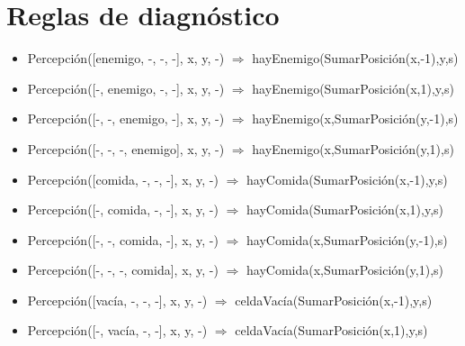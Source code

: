 \section{Reglas de diagnóstico}

\begin{itemize}

\item Percepción([enemigo, -, -, -], x, y, -) $\Rightarrow$
\newline hayEnemigo(SumarPosición(x,-1),y,s)

\item Percepción([-, enemigo, -, -], x, y, -) $\Rightarrow$
\newline hayEnemigo(SumarPosición(x,1),y,s)

\item Percepción([-, -, enemigo, -], x, y, -) $\Rightarrow$
\newline hayEnemigo(x,SumarPosición(y,-1),s)

\item Percepción([-, -, -, enemigo], x, y, -) $\Rightarrow$
\newline hayEnemigo(x,SumarPosición(y,1),s)

\item Percepción([comida, -, -, -], x, y, -) $\Rightarrow$
\newline hayComida(SumarPosición(x,-1),y,s)

\item Percepción([-, comida, -, -], x, y, -) $\Rightarrow$
\newline hayComida(SumarPosición(x,1),y,s)

\item Percepción([-, -, comida, -], x, y, -) $\Rightarrow$
\newline hayComida(x,SumarPosición(y,-1),s)

\item Percepción([-, -, -, comida], x, y, -) $\Rightarrow$
\newline hayComida(x,SumarPosición(y,1),s)

\item Percepción([vacía, -, -, -], x, y, -) $\Rightarrow$
\newline celdaVacía(SumarPosición(x,-1),y,s)

\item Percepción([-, vacía, -, -], x, y, -) $\Rightarrow$
\newline celdaVacía(SumarPosición(x,1),y,s)


\end{itemize}
